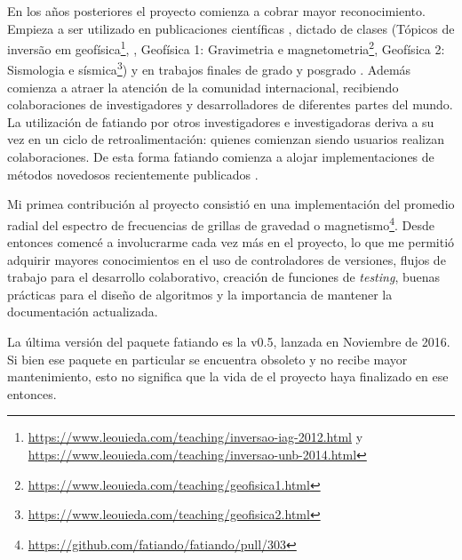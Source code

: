 En los años posteriores el proyecto comienza a cobrar mayor reconocimiento.
Empieza a ser utilizado en publicaciones científicas
\citep[][entre otros]{%
    uieda2012,
    carlos2014,
    oliveira2015,
    hidalgogato2015,
    carlos2016,
    reis2016,
    uieda2017,
    hidalgogato2017,
    siqueira2017%
},
dictado de clases
(Tópicos de inversão em
geofísica\footnote{%
    \url{https://www.leouieda.com/teaching/inversao-iag-2012.html}
    y \url{https://www.leouieda.com/teaching/inversao-unb-2014.html}
},
\citet{uieda2014},
Geofísica 1: Gravimetria e magnetometria\footnote{%
    \url{https://www.leouieda.com/teaching/geofisica1.html}
},
Geofísica 2: Sismologia e sísmica\footnote{%
    \url{https://www.leouieda.com/teaching/geofisica2.html}
})
y en trabajos finales de grado y posgrado
\citep{carlos2013, sales2014, soler2015, uieda2016b, melo2020}.
Además comienza a atraer la atención de la comunidad internacional, recibiendo
colaboraciones de investigadores y desarrolladores de diferentes partes del
mundo.
La utilización de fatiando por otros investigadores e investigadoras deriva
a su vez en un ciclo de retroalimentación: quienes comienzan siendo usuarios
realizan colaboraciones.
De esta forma fatiando comienza a alojar implementaciones de métodos
novedosos recientemente publicados \citep{uieda2012b, oliveira2013}.

Mi primea contribución al proyecto consistió en una implementación del promedio
radial del espectro de frecuencias de grillas de gravedad
o magnetismo\footnote{%
    \url{https://github.com/fatiando/fatiando/pull/303}
}.
Desde entonces comencé a involucrarme cada vez más en el proyecto, lo que me
permitió adquirir mayores conocimientos en el uso de controladores de
versiones, flujos de trabajo para el desarrollo colaborativo, creación de
funciones de \emph{testing}, buenas prácticas para el diseño de algoritmos y la
importancia de mantener la documentación actualizada.

La última versión del paquete fatiando es la v0.5, lanzada en Noviembre de
2016.
Si bien ese paquete en particular se encuentra obsoleto y no recibe mayor
mantenimiento, esto no significa que la vida de el proyecto haya finalizado en
ese entonces.

